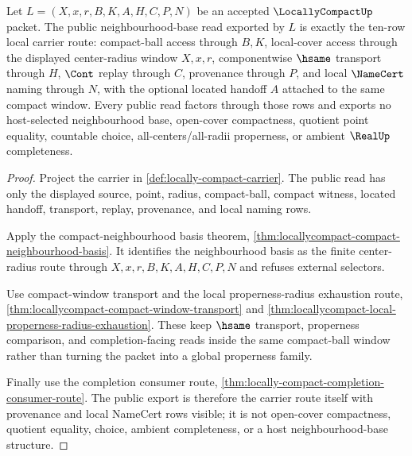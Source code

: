 \begin{theorem}
\label{thm:locallycompact-public-neighbourhood-base-export}
Let $L=(X,x,r,B,K,A,H,C,P,N)$ be an accepted $\LocallyCompactUp$ packet. The public neighbourhood-base read exported by $L$ is exactly the ten-row local carrier route: compact-ball access through $B,K$, local-cover access through the displayed center-radius window $X,x,r$, componentwise $\hsame$ transport through $H$, $\Cont$ replay through $C$, provenance through $P$, and local $\NameCert$ naming through $N$, with the optional located handoff $A$ attached to the same compact window. Every public read factors through those rows and exports no host-selected neighbourhood base, open-cover compactness, quotient point equality, countable choice, all-centers/all-radii properness, or ambient $\RealUp$ completeness.
\end{theorem}
\begin{proof}
Project the carrier in \autoref{def:locally-compact-carrier}. The public read has only the displayed source, point, radius, compact-ball, compact witness, located handoff, transport, replay, provenance, and local naming rows.

Apply the compact-neighbourhood basis theorem, \autoref{thm:locallycompact-compact-neighbourhood-basis}. It identifies the neighbourhood basis as the finite center-radius route through $X,x,r,B,K,A,H,C,P,N$ and refuses external selectors.

Use compact-window transport and the local properness-radius exhaustion route, \autoref{thm:locallycompact-compact-window-transport} and \autoref{thm:locallycompact-local-properness-radius-exhaustion}. These keep $\hsame$ transport, properness comparison, and completion-facing reads inside the same compact-ball window rather than turning the packet into a global properness family.

Finally use the completion consumer route, \autoref{thm:locally-compact-completion-consumer-route}. The public export is therefore the carrier route itself with provenance and local NameCert rows visible; it is not open-cover compactness, quotient equality, choice, ambient completeness, or a host neighbourhood-base structure.
\end{proof}

